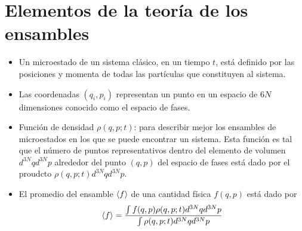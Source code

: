 \section{Elementos de la teoría de los ensambles}
\begin{itemize}
	\item Un microestado de un sistema clásico, en un tiempo $t$, está
	definido por las posiciones y momenta de todas las partículas
	que constituyen al sistema.
	\item Las coordenadas $(q_i,p_i)$ representan un punto en 
	un espacio de $6N$ dimensiones conocido como el espacio de fases.
	\item Función de densidad $\rho(q,p;t)$: para describir mejor 
	los ensambles de microestados en los que se puede encontrar
	un sistema. Esta función es tal que el número de puntos 
	representativos dentro del elemento de volumen $d^{3N}qd^{3N}p$
	alrededor del punto $(q,p)$ del espacio de fases está dado por 
	el proudcto $\rho(q,p;t)d^{3N}qd^{3N}p$.
	\item El promedio del ensamble $\expval{f}$ de una cantidad
	física $f(q,p)$ está dado por 
	\begin{align}
	\expval{f}=
	\frac{\int f(q,p)\rho(q,p;t)d^{3N}qd^{3N}p}{\int \rho(q,p;t)d^{3N}qd^{3N}p}
	\end{align}
	

\end{itemize}
